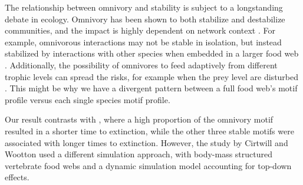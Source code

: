 \documentclass[12pt]{article}
\begin{document}
\begin{spacing}{2.0}
The relationship between omnivory and stability is subject to a longstanding debate in ecology. Omnivory has been shown to both stabilize and destabilize communities, and the impact is highly dependent on network context \citep{bascompte2005simple, MonteiroFaria2016, Kratinaetal2012}. 
For example, omnivorous interactions may not be stable in isolation, but instead stabilized by interactions with other species when embedded in a larger food web \citep{Kratinaetal2012}. Additionally, the possibility of omnivores to feed adaptively from different trophic levels can spread the risks, for example when the prey level are disturbed \citep{Fagan1997}.
This might be why we have a divergent pattern between a full food web's motif profile versus each single species motif profile.

Our result contrasts with \citep{Cirtwill2021_inprep}, where a high proportion of the omnivory motif resulted in a shorter time to extinction, while the other three stable motifs were associated with longer times to extinction. However, the study by Cirtwill and Wootton used a different simulation approach, with body-mass structured vertebrate food webs and a dynamic simulation model accounting for top-down effects. 

    
    

\end{spacing}
\end{document}
